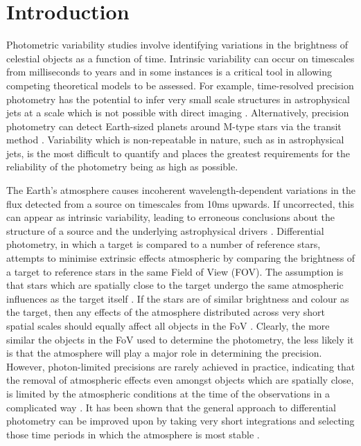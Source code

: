 \documentclass{aa}
\begin{document}
\maketitle

\section{Introduction}
\label{introduction}

Photometric variability studies involve identifying variations in the brightness of celestial objects as a function of time. Intrinsic variability can occur on timescales from milliseconds to years and in some instances is a critical tool in allowing competing theoretical models to be assessed. For example, time-resolved precision photometry has the potential to infer very small scale structures in astrophysical jets at a scale which is not possible with direct imaging \citep{smith2008emccd}. Alternatively, precision photometry can detect Earth-sized planets around M-type stars via the transit method \citep{giltinan2011using,everett2001technique}.  Variability which is non-repeatable in nature, such as in astrophysical jets, is the most difficult to quantify and places the greatest requirements for the reliability of the photometry being as high as possible. 

The Earth’s atmosphere causes incoherent wavelength-dependent variations in the flux detected from a source on timescales from 10ms upwards. If uncorrected, this can appear as intrinsic variability, leading to erroneous conclusions about the structure of a source and the underlying astrophysical drivers \citep{smith2008emccd}. Differential photometry, in which a target is compared to a number of reference stars, attempts to minimise extrinsic effects atmospheric by comparing the brightness of a target to reference stars in the same Field of View (FOV). The assumption is that stars which are spatially close to the target undergo the same atmospheric influences as the target itself \citep{burdanov2014astrokit}. If the stars are of similar brightness and colour as the target, then any effects of the atmosphere distributed across very short spatial scales should equally affect all objects in the FoV \citep{young1991precise,howell2006handbook}. Clearly, the more similar the objects in the FoV used to determine the photometry, the less likely it is that the atmosphere will play a major role in determining the precision. However, photon-limited precisions are rarely achieved in practice, indicating that the removal of atmospheric effects even amongst objects which are spatially close, is limited by the atmospheric conditions at the time of the observations in a complicated way \citep{everett2001technique,howell2002some}.   It has been shown that the general approach to differential photometry can be improved upon by taking very short integrations and selecting those time periods in which the atmosphere is most stable \citep{giltinan2011using}.
\end{document}
